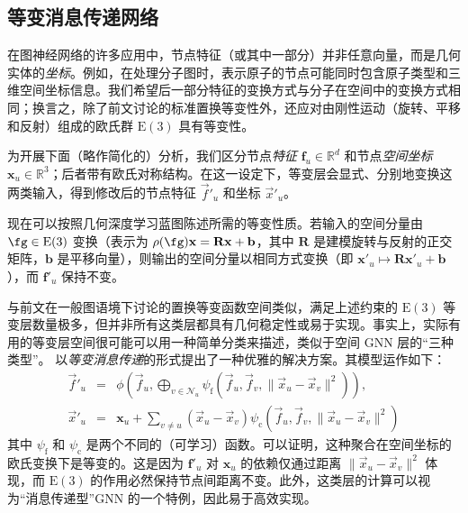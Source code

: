 \subsection{等变消息传递网络}

在图神经网络的许多应用中，节点特征（或其中一部分）并非任意向量，而是几何实体的\emph{坐标}。例如，在处理分子图时，表示原子的节点可能同时包含原子类型和三维空间坐标信息。我们希望后一部分特征的变换方式与分子在空间中的变换方式相同；换言之，除了前文讨论的标准置换等变性外，还应对由刚性运动（旋转、平移和反射）组成的欧氏群 $\mathrm{E}(3)$ 具有等变性。

为开展下面（略作简化的）分析，我们区分节点{\em 特征} $\mathbf{f}_u \in \mathbb{R}^d$ 和节点{\em 空间坐标} $\mathbf{x}_u\in \mathbb{R}^3$；后者带有欧氏对称结构。在这一设定下，等变层会显式、分别地变换这两类输入，得到修改后的节点特征 $\vec{f}'_u$ 和坐标 $\vec{x}'_u$。

现在可以按照几何深度学习蓝图陈述所需的等变性质。若输入的空间分量由 $\fg\in \mathrm{E}(3)$ 变换（表示为 $\rho(\fg)\mathbf{x} = \mathbf{R}\mathbf{x} + \mathbf{b}$，其中 $\mathbf{R}$ 是建模旋转与反射的正交矩阵，$\mathbf{b}$ 是平移向量），则输出的空间分量以相同方式变换（即 $\mathbf{x}'_u \mapsto \mathbf{R}\mathbf{x}'_u + \mathbf{b}$），而 $\mathbf{f}'_u$ 保持不变。

与前文在一般图语境下讨论的置换等变函数空间类似，满足上述约束的 $\mathrm{E}(3)$ 等变层数量极多，但并非所有这类层都具有几何稳定性或易于实现。事实上，实际有用的等变层空间很可能可以用一种简单分类来描述，类似于空间 GNN 层的“三种类型”。
%
\cite{satorras2021n} 以{\em 等变消息传递}的形式提出了一种优雅的解决方案。其模型运作如下：
%
\begin{eqnarray*}
    \vec{f}'_u &=& \phi\left(\vec{f}_u, \bigoplus\limits_{v\in\mathcal{N}_u}\psi_\mathrm{f}(\vec{f}_u, \vec{f}_v, \| \vec{x}_u - \vec{x}_v \|^2)\right), \\
    \vec{x}'_u &=& \mathbf{x}_u + \sum_{v\neq u} (\vec{x}_u - \vec{x}_v) \psi_\mathrm{c}(\vec{f}_u, \vec{f}_v, \| \vec{x}_u - \vec{x}_v \|^2)
\end{eqnarray*}
%
其中 $\psi_\mathrm{f}$ 和 $\psi_\mathrm{c}$ 是两个不同的（可学习）函数。可以证明，这种聚合在空间坐标的欧氏变换下是等变的。这是因为 $\mathbf{f}'_u$ 对 $\mathbf{x}_u$ 的依赖仅通过距离 $\| \vec{x}_u - \vec{x}_v \|^2$ 体现，而 $\mathrm{E}(3)$ 的作用必然保持节点间距离不变。此外，这类层的计算可以视为“消息传递型”GNN 的一个特例，因此易于高效实现。

